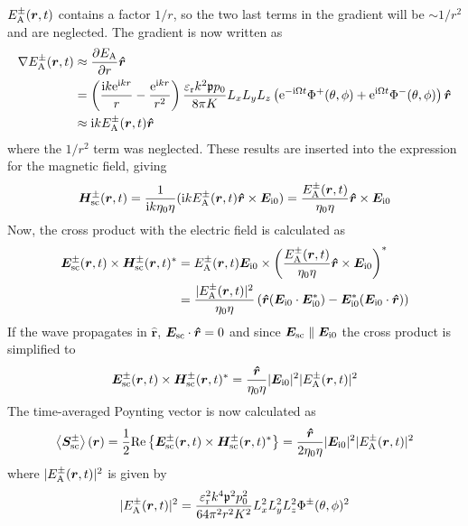 \documentclass[11pt,twoside]{eitExjobb}
\begin{document}
	$E_{\mathrm{A}}^\pm (\bm{r}, t)$ contains a factor $1/r$, so the two last terms in the gradient will be $\sim 1/r^2$ and are neglected. The gradient is now written as
	\begin{equation*}
	\begin{split}
		\nabla E_{\mathrm{A}}^\pm (\bm{r}, t) &\approx \frac{\partial E_{\mathrm{A}}}{\partial r} \bm{\hat{r}} \\
		&= \left( \frac{\mathrm{i} k\mathrm{e}^{\mathrm{i} kr}}{r} - \frac{\mathrm{e}^{\mathrm{i} kr}}{r^2} \right) \frac{\varepsilon_{\mathrm{r}}k^2 \mathfrak{p} p_0}{8\pi K} L_{x} L_{y} L_{z} \left( \mathrm{e}^{- \mathrm{i} \Omega t} \Phi^+ (\theta,\phi) + \mathrm{e}^{\mathrm{i} \Omega t} \Phi^- (\theta,\phi) \right) \bm{\hat{r}} \\
		&\approx \mathrm{i} kE_{\mathrm{A}}^\pm (\bm{r}, t) \bm{\hat{r}}
	\end{split}
	\end{equation*}
	where the $1/r^2$ term was neglected. These results are inserted into the expression for the magnetic field, giving
	\begin{equation*}
		\bm{H}_{\mathrm{sc}}^\pm (\bm{r}, t) = \frac{1}{\mathrm{i} k \eta_0 \eta} (\mathrm{i} kE_{\mathrm{A}}^\pm (\bm{r}, t) \bm{\hat{r}} \times \bm{E}_{\mathrm{i}0}) = \frac{E_{\mathrm{A}}^\pm (\bm{r}, t)}{ \eta_0 \eta} \bm{\hat{r}} \times \bm{E}_{\mathrm{i}0}
	\end{equation*}
	Now, the cross product with the electric field is calculated as
	\begin{equation*}
	\begin{split}
		\bm{E}_{\mathrm{sc}}^\pm (\bm{r}, t) \times \bm{H}_{\mathrm{sc}}^{\pm} (\bm{r}, t)^* &= E_{\mathrm{A}}^\pm (\bm{r}, t) \bm{E}_{\mathrm{i}0} \times \left( \frac{E_{\mathrm{A}}^\pm (\bm{r}, t)}{ \eta_0 \eta} \bm{\hat{r}} \times \bm{E}_{\mathrm{i}0} \right)^* \\
		&= \frac{|E_{\mathrm{A}}^\pm (\bm{r}, t)|^2}{\eta_0 \eta} \left( \bm{\hat{r}} (\bm{E}_{\mathrm{i}0} \cdot \bm{E}_{\mathrm{i}0}^*) - \bm{E}_{\mathrm{i}0}^* (\bm{E}_{\mathrm{i}0} \cdot \bm{\hat{r}}) \right)
	\end{split}
	\end{equation*}
	If the wave propagates in $\bm{\hat{r}}$, $\bm{E}_{\mathrm{sc}} \cdot \bm{\hat{r}} = 0$ and since $\bm{E}_{\mathrm{sc}} \parallel \bm{E}_{\mathrm{i}0}$ the cross product is simplified to
	\begin{equation*}
		\bm{E}_{\mathrm{sc}}^\pm (\bm{r}, t) \times \bm{H}_{\mathrm{sc}}^{\pm} (\bm{r}, t)^* = \frac{\bm{\hat{r}}}{\eta_0 \eta} |\bm{E}_{\mathrm{i}0}|^2 |E_{\mathrm{A}}^\pm (\bm{r},t)|^2
	\end{equation*}
	The time-averaged Poynting vector is now calculated as
	\begin{equation*}
		\left< \bm{S}_{\mathrm{sc}}^\pm \right> (\bm{r}) = \frac{1}{2}\mathrm{Re}\left\{ \bm{E}_{\mathrm{sc}}^\pm (\bm{r}, t) \times \bm{H}_{\mathrm{sc}}^{\pm} (\bm{r}, t)^* \right\} = \frac{\bm{\hat{r}}}{2\eta_0 \eta} |\bm{E}_{\mathrm{i}0}|^2 |E_{\mathrm{A}}^\pm (\bm{r},t)|^2
	\end{equation*}
	where $|E_{\mathrm{A}}^\pm (\bm{r},t)|^2$ is given by
	\begin{equation*}
		|E_{\mathrm{A}}^\pm (\bm{r},t)|^2 = \frac{\varepsilon_{\mathrm{r}}^2 k^4 \mathfrak{p}^2 p_0^2}{64\pi^2 r^2 K^2} L_{x}^2 L_{y}^2 L_{z}^2 \Phi^\pm (\theta,\phi)^2
	\end{equation*}
	
\end{document}
